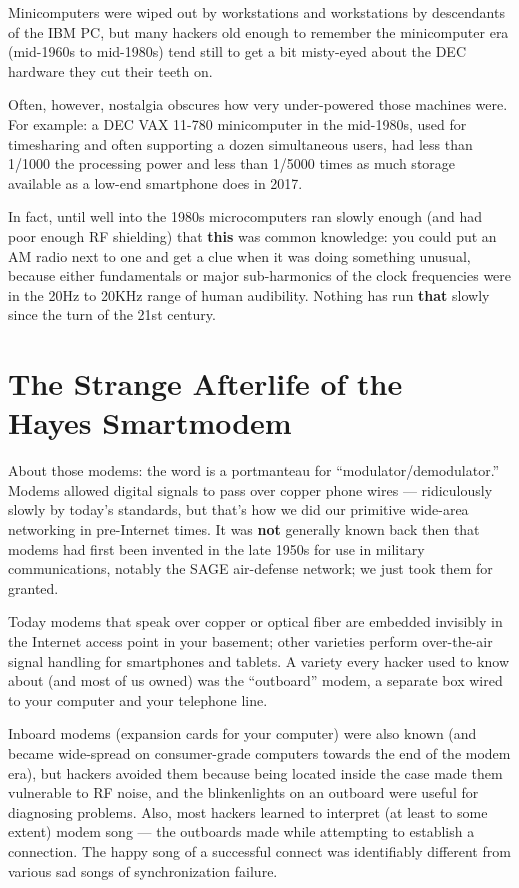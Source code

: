 \documentclass[12pt,letterpaper]{article}
\newcommand{\mc}{\small}
\newcommand{\acro}[1]{{\mc #1\spacefactor1000}}
\begin{document}
Minicomputers were wiped out by workstations and workstations by descendants of
the \acro{IBM PC}, but many hackers old enough to remember the minicomputer era
(mid-1960s to mid-1980s) tend still to get a bit misty-eyed about the \acro{DEC}
hardware they cut their teeth on.

Often, however, nostalgia obscures how very under-powered those machines were.
For example: a \acro{DEC VAX 11-780} minicomputer in the mid-1980s, used for
timesharing and often supporting a dozen simultaneous users, had less than
1/1000 the processing power and less than 1/5000 times as much storage
available as a low-end smartphone does in 2017.

In fact, until well into the 1980s microcomputers ran slowly enough (and had
poor enough \acro{RF} shielding) that \textbf{this} was common knowledge: you
could put an \acro{AM} radio next to one and get a clue when it was doing
something unusual, because either fundamentals or major sub-harmonics of the
clock frequencies were in the 20Hz to 20KHz range of human audibility. Nothing
has run \textbf{that} slowly since the turn of the 21st century.

\section[The Strange Afterlife of the Hayes Smartmodem]{The Strange Afterlife of the\\ Hayes Smartmodem}
About those modems: the word is a portmanteau for ``modulator/demodulator.''
Modems allowed digital signals to pass over copper phone wires --- ridiculously
slowly by today's standards, but that's how we did our primitive wide-area
networking in pre-Internet times. It was \textbf{not} generally known back then that
modems had first been invented in the late 1950s for use in military
communications, notably the \acro{SAGE} air-defense network; we just took them for
granted.

Today modems that speak over copper or optical fiber are embedded invisibly in
the Internet access point in your basement; other varieties perform
over-the-air signal handling for smartphones and tablets. A variety every
hacker used to know about (and most of us owned) was the ``outboard'' modem, a
separate box wired to your computer and your telephone line.

Inboard modems (expansion cards for your computer) were also known (and became
wide-spread on consumer-grade computers towards the end of the modem era), but
hackers avoided them because being located inside the case made them vulnerable
to \acro{RF} noise, and the blinkenlights on an outboard were useful for diagnosing
problems. Also, most hackers learned to interpret (at least to some extent)
modem song --- the outboards made while attempting to establish a connection. The
happy song of a successful connect was identifiably different from various sad
songs of synchronization failure.
\end{document}
